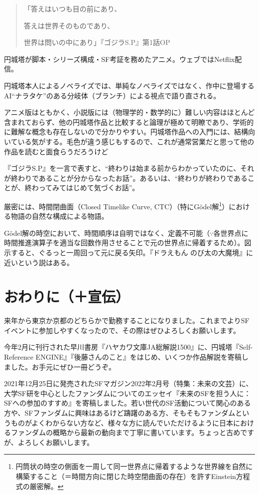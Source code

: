 \documentclass[10pt, a5paper, twoside]{jsarticle}
\theoremstyle{definition}
\begin{document}
		\begin{quote}

			「答えはいつも目の前にあり、

			答えは世界そのものであり、
			
			世界は問いの中にあり」\hspace{\fill}『ゴジラS.P』第1話OP
		
		\end{quote}

		円城塔が脚本・シリーズ構成・SF考証を務めたアニメ。ウェブではNetflix配信。

		円城塔本人によるノベライズでは、単純なノベライズではなく、作中に登場するAI“ナラタケ”のある分岐体（ブランチ）による視点で語り直される。

		アニメ版はともかく、小説版には（物理学的・数学的に）難しい内容はほとんど含まれておらず、他の円城塔作品と比較すると論理が極めて明瞭であり、学術的に難解な概念も存在しないので分かりやすい。円城塔作品への入門には、結構向いている気がする。毛色が違う感じもするので、これが通常営業だと思って他の作品を読むと面食らうだろうけど

		『ゴジラS.P』を一言で表すと、“終わりは始まる前からわかっていたのに、それが終わりであることが分からなったお話”。あるいは、“終わりが終わりであることが、終わってみてはじめて気づくお話”。

		厳密には、時間閉曲面（Closed Timelike Curve, CTC）（特にGödel解\footnote{円筒状の時空の側面を一周して同一世界点に帰着するような世界線を自然に構築すること（＝時間方向に閉じた時空閉曲面の存在）を許すEinstein方程式の厳密解。}）における物語の自然な構成による物語。

		Gödel解の時空において、時間順序は自明ではなく、定義不可能（$ \because $各世界点に時間推進演算子を適当な回数作用させることで元の世界点に帰着するため）。図示すると、ぐるっと一周回って元に戻る矢印。『ドラえもん のび太の大魔境』に近いという説はある。


	\section{おわりに（＋宣伝）}

		来年から東京か京都のどちらかで勤務することになりました。これまでよりSFイベントに参加しやすくなったので、その際はぜひよろしくお願いします。

		今年2月に刊行された早川書房『ハヤカワ文庫JA総解説1500』に、円城塔『Self-Reference ENGINE』『後藤さんのこと』をはじめ、いくつか作品解説を寄稿しました。お手元にぜひ一冊どうぞ。

		2021年12月25日に発売されたSFマガジン2022年2月号（特集：未来の文芸）に、大学SF研を中心としたファンダムについてのエッセイ『未来のSFを担う人に：SFへの参加のすすめ』を寄稿しました。若い世代のSF活動について関心のある方や、SFファンダムに興味はあるけど躊躇のある方、そもそもファンダムというものがよくわからない方など、様々な方に読んでいただけるように日本におけるファンダムの概略から最新の動向まで丁寧に書いています。ちょっと古めですが、よろしくお願いします。
\end{document}
